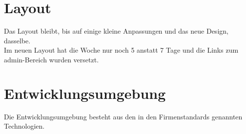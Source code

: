 \section{Layout}
Das Layout bleibt, bis auf einige kleine Anpassungen und das neue Design, dasselbe.\\
Im neuen Layout hat die Woche nur noch 5 anstatt 7 Tage und die Links zum admin-Bereich wurden versetzt.
\section{Entwicklungsumgebung}
Die Entwicklungsumgebung besteht aus den in den Firmenstandards genannten Technologien.

